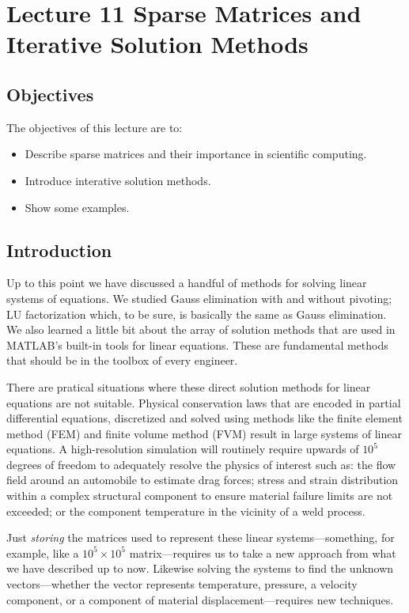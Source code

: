 \chapter{Lecture 11 Sparse Matrices and Iterative Solution Methods}
\label{ch:lec11n}
\section{Objectives}
The objectives of this lecture are to:
\begin{itemize}
\item Describe sparse matrices and their importance in scientific computing.
\item Introduce interative solution methods.
\item Show some examples.
\end{itemize}
\setcounter{lstannotation}{0}

\section{Introduction}
Up to this point we have discussed a handful of methods for solving linear systems of equations.  We studied Gauss elimination with and without pivoting; LU factorization which, to be sure, is basically the same as Gauss elimination.  We also learned a little bit about the array of solution methods that are used in MATLAB's built-in tools for linear equations.  These are fundamental methods that should be in the toolbox of every engineer.

There are pratical situations where these direct solution methods for linear equations are not suitable.  Physical conservation laws that are encoded in partial differential equations, discretized and solved using methods like the finite element method (FEM) and finite volume method (FVM) result in large systems of linear equations.  A high-resolution simulation will routinely require upwards of $10^5$ degrees of freedom to adequately resolve the physics of interest such as: the flow field around an automobile to estimate drag forces; stress and strain distribution within a complex structural component to ensure material failure limits are not exceeded; or the component temperature in the vicinity of a weld process.

Just \emph{storing} the matrices used to represent these linear systems---something, for example, like a $10^5 \times 10^5$ matrix---requires us to take a new approach from what we have described up to now.  Likewise solving the systems to find the unknown vectors---whether the vector represents temperature, pressure, a velocity component, or a component of material displacement---requires new techniques.

